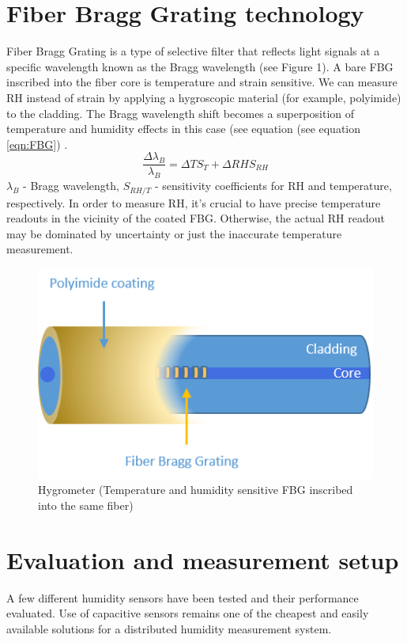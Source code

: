 \section{Fiber Bragg Grating technology}

Fiber Bragg Grating is a type of selective filter that reflects light signals at a specific wavelength known as the Bragg wavelength (see Figure 1). A bare FBG inscribed into the fiber core is temperature and strain sensitive.
We can measure RH instead of strain by applying a hygroscopic material (for example, polyimide) to the cladding. The Bragg wavelength shift becomes a superposition of temperature and humidity effects in this case (see equation (see equation \ref{eqn:FBG}) \cite{Kronenberg:02}. 
                             \begin{equation}\label{eqn:FBG}
                                    \frac{\Delta\lambda_{B}}{\lambda_{B}}=\Delta TS_{T}+\Delta RHS_{RH}
                            \end{equation}
                            $\lambda_{B}$ - Bragg wavelength, $S_{RH/T}$ - sensitivity  coefficients for RH and temperature, respectively. \newline
In order to measure RH, it’s crucial to have precise temperature readouts in the vicinity of the coated FBG. Otherwise, the actual RH readout may be dominated by uncertainty or just the inaccurate temperature measurement.

\begin{figure}[!h]
\centering
\includegraphics[width=0.4\columnwidth]{Chapter4/Images/Picture1.png}
\caption{Hygrometer (Temperature and humidity sensitive FBG inscribed into the same fiber)}
\label{fig_single_photo}
\end{figure}
\section{Evaluation and measurement setup}
A few different humidity sensors have been tested and their performance evaluated. Use of capacitive sensors remains one of the cheapest and easily available solutions for a distributed humidity measurement system. 


